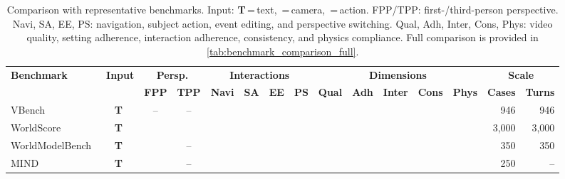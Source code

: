 \documentclass{llmxive}
\providecommand{\cmark}{\ding{51}}
\providecommand{\xmark}{\ding{55}}
\providecommand{\arraystretch}{1.05}
\providecommand{\iOn}[1]{#1}
\providecommand{\iOff}[1]{#1}
\begin{document}
\begin{table}[t]
\caption[Comparison with representative benchmarks]{Comparison with representative benchmarks. Input: {\small\textsf{\textbf{T}}}\,=\,text, {\small}\,=\,camera, {\small}\,=\,action. FPP\hspace{1pt}/\hspace{1pt}TPP: first-\hspace{1pt}/\hspace{1pt}third-person perspective. Navi, SA, EE, PS: navigation, subject action, event editing, and perspective switching. Qual, Adh, Inter, Cons, Phys: video quality, setting adherence, interaction adherence, consistency, and physics compliance. Full comparison is provided in \cref{tab:benchmark_comparison_full}.}
\vspace{+1mm}
\label{tab:benchmark_comparison}
\centering
\renewcommand{\arraystretch}{1.05}
\footnotesize
\setlength{\tabcolsep}{4.4pt}
\renewcommand{\iOn}[1]{#1}
\renewcommand{\iOff}[1]{#1}
\begin{tabular}{@{}l c cc cccc ccccc rr@{}}
\toprule
\multirow{2.5}{*}{\textbf{Benchmark}} & \multirow{2.5}{*}{\textbf{Input}} & \multicolumn{2}{c}{\textbf{Persp.}} & \multicolumn{4}{c}{\textbf{Interactions}} & \multicolumn{5}{c}{\textbf{Dimensions}} & \multicolumn{2}{c}{\textbf{Scale}} \\
\cmidrule(lr){3-4} \cmidrule(lr){5-8} \cmidrule(lr){9-13} \cmidrule(l){14-15}
& & \textbf{FPP} & \textbf{TPP} & \textbf{Navi} & \textbf{SA} & \textbf{EE} & \textbf{PS} & \textbf{Qual} & \textbf{Adh} & \textbf{Inter} & \textbf{Cons} & \textbf{Phys} & \textbf{Cases} & \textbf{Turns} \\
\midrule
VBench~\cite{huang2024vbench}                     & \iOn{\textsf{\textbf{T}}}\,\iOff{}\,\iOff{}     & -- & -- & \xmark & \xmark & \xmark & \xmark & \cmark & \xmark & \xmark & \xmark & \xmark & 946   & 946   \\
WorldScore~\cite{duan2024worldscore}              & \iOn{\textsf{\textbf{T}}}\,\iOn{}\,\iOff{}     & \cmark & \xmark & \cmark & \xmark & \cmark & \xmark & \cmark & \cmark & \xmark & \xmark & \xmark & 3,000 & 3,000 \\
WorldModelBench~\cite{wang2024worldmodelbench}    & \iOn{\textsf{\textbf{T}}}\,\iOff{}\,\iOff{}     & \cmark & -- & \cmark & \cmark & \xmark & \xmark & \xmark & \cmark & \cmark & \xmark & \cmark & 350   & 350   \\
MIND~\cite{ye2026mind}                            & \iOff{\textsf{\textbf{T}}}\,\iOn{}\,\iOff{}     & \cmark & -- & \cmark & \xmark & \xmark & \xmark & \cmark & \xmark & \cmark & \cmark & \xmark & 250   & --    \\

\end{tabular}
\end{table}
\end{document}
